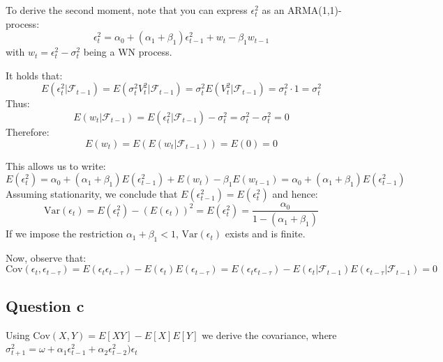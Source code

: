 \documentclass{article}
\begin{document}
To derive the second moment, note that you can express \( \epsilon_t^2 \) as an ARMA(1,1)-process:
\begin{equation}
\epsilon_t^2 = \alpha_0 + (\alpha_1 + \beta_1)\epsilon_{t-1}^2 + w_t - \beta_1 w_{t-1}
\end{equation}
with \( w_t = \epsilon_t^2 - \sigma_t^2 \) being a WN process.

It holds that:
\begin{equation}
E(\epsilon_t^2 | \mathcal{F}_{t-1}) = E(\sigma_t^2 V_t^2 | \mathcal{F}_{t-1}) = \sigma_t^2 E(V_t^2 | \mathcal{F}_{t-1}) = \sigma_t^2 \cdot 1 = \sigma_t^2
\end{equation}
Thus:
\begin{equation}
E(w_t | \mathcal{F}_{t-1}) = E(\epsilon_t^2 | \mathcal{F}_{t-1}) - \sigma_t^2 = \sigma_t^2 - \sigma_t^2 = 0
\end{equation}
Therefore:
\begin{equation}
E(w_t) = E(E(w_t | \mathcal{F}_{t-1})) = E(0) = 0
\end{equation}

This allows us to write:
\begin{equation}
E(\epsilon_t^2) = \alpha_0 + (\alpha_1 + \beta_1)E(\epsilon_{t-1}^2) + E(w_t) - \beta_1 E(w_{t-1}) = \alpha_0 + (\alpha_1 + \beta_1)E(\epsilon_{t-1}^2)
\end{equation}
Assuming stationarity, we conclude that \( E(\epsilon_{t-1}^2) = E(\epsilon_t^2) \) and hence:
\begin{equation}
\mathrm{Var}(\epsilon_t) = E(\epsilon_t^2) - (E(\epsilon_t))^2 = E(\epsilon_t^2) = \frac{\alpha_0}{1 - (\alpha_1 + \beta_1)}
\end{equation}
If we impose the restriction \( \alpha_1 + \beta_1 < 1 \), \( \mathrm{Var}(\epsilon_t) \) exists and is finite.

Now, observe that:
\begin{equation}
\mathrm{Cov}(\epsilon_t, \epsilon_{t-\tau}) = E(\epsilon_t \epsilon_{t-\tau}) - E(\epsilon_t)E(\epsilon_{t-\tau}) = E(\epsilon_t \epsilon_{t-\tau}) - E(\epsilon_t | \mathcal{F}_{t-1})E(\epsilon_{t-\tau} | \mathcal{F}_{t-1}) = 0
\end{equation}



\subsection*{Question c}

Using $\text{Cov} (X, Y) = E[XY] - E[X]E[Y]$ we derive the covariance, where $\sigma^2_{t+1} = \omega + \alpha_1 \epsilon_{t-1}^2 + \alpha_2 \epsilon^2_{t-2}) \epsilon_t$
\end{document}
